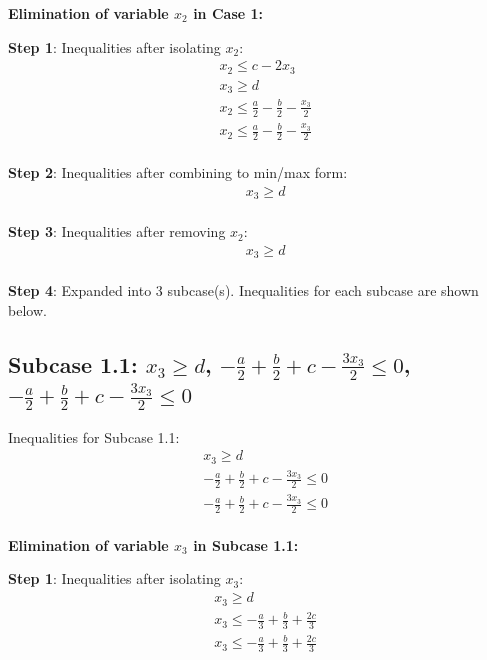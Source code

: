 \documentclass{article}
\begin{document}
\textbf{Elimination of variable $x_{2}$ in Case 1:}

\textbf{Step 1}: Inequalities after isolating $x_{2}$:
\begin{align}
& x_{2} \leq c - 2 x_{3} \\
& x_{3} \geq d \\
& x_{2} \leq \frac{a}{2} - \frac{b}{2} - \frac{x_{3}}{2} \\
& x_{2} \leq \frac{a}{2} - \frac{b}{2} - \frac{x_{3}}{2} \\
\end{align}

\textbf{Step 2}: Inequalities after combining to min/max form:
\begin{align}
& x_{3} \geq d \\
\end{align}

\textbf{Step 3}: Inequalities after removing $x_{2}$:
\begin{align}
& x_{3} \geq d \\
\end{align}

\textbf{Step 4}: Expanded into 3 subcase(s). Inequalities for each subcase are shown below.

\subsection{Subcase 1.1: $x_{3} \geq d$, $- \frac{a}{2} + \frac{b}{2} + c - \frac{3 x_{3}}{2} \leq 0$, $- \frac{a}{2} + \frac{b}{2} + c - \frac{3 x_{3}}{2} \leq 0$}

Inequalities for Subcase 1.1:
\begin{align}
& x_{3} \geq d \\
& - \frac{a}{2} + \frac{b}{2} + c - \frac{3 x_{3}}{2} \leq 0 \\
& - \frac{a}{2} + \frac{b}{2} + c - \frac{3 x_{3}}{2} \leq 0 \\
\end{align}

\textbf{Elimination of variable $x_{3}$ in Subcase 1.1:}

\textbf{Step 1}: Inequalities after isolating $x_{3}$:
\begin{align}
& x_{3} \geq d \\
& x_{3} \leq - \frac{a}{3} + \frac{b}{3} + \frac{2 c}{3} \\
& x_{3} \leq - \frac{a}{3} + \frac{b}{3} + \frac{2 c}{3} \\
\end{align}
\end{document}
